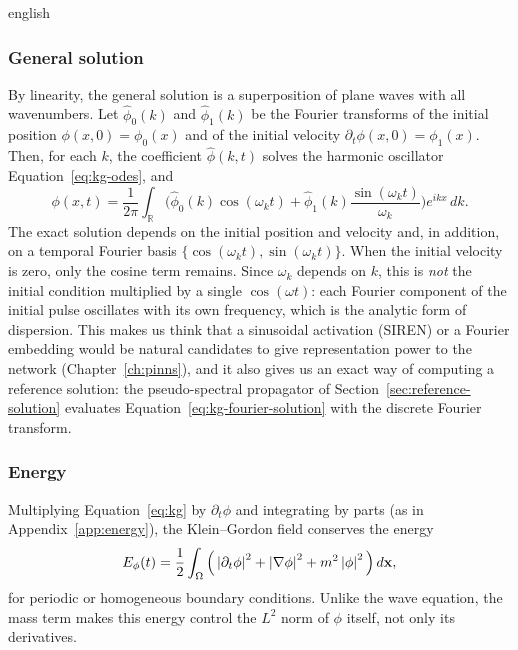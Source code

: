 \begin{hyphenrules}{english}
\subsubsection{General solution}
By linearity, the general solution is a superposition of plane waves with all wavenumbers. Let
$\hat\phi_0(k)$ and $\hat\phi_1(k)$ be the Fourier transforms of the initial position
$\phi(x,0)=\phi_0(x)$ and of the initial velocity $\partial_t\phi(x,0)=\phi_1(x)$. Then, for each $k$,
the coefficient $\hat\phi(k,t)$ solves the harmonic oscillator Equation~\eqref{eq:kg-odes}, and
\begin{equation}
  \phi(x,t)=\frac{1}{2\pi}\int_{\mathbb{R}}\Big(\hat\phi_0(k)\cos(\omega_kt)
  +\hat\phi_1(k)\frac{\sin(\omega_kt)}{\omega_k}\Big)e^{ikx}\,d k.
  \label{eq:kg-fourier-solution}
\end{equation}
The exact solution depends on the initial position and velocity and, in addition, on a temporal
Fourier basis $\{\cos(\omega_kt),\sin(\omega_kt)\}$. When the initial velocity is zero, only the cosine
term remains. Since $\omega_k$ depends on $k$, this is \emph{not} the initial condition multiplied by a
single $\cos(\omega t)$: each Fourier component of the initial pulse oscillates with its own frequency,
which is the analytic form of dispersion. This makes us think that a sinusoidal activation (SIREN) or a
Fourier embedding would be natural candidates to give representation power to the network
(Chapter~\ref{ch:pinns}), and it also gives us an exact way of computing a reference solution: the
pseudo-spectral propagator of Section~\ref{sec:reference-solution} evaluates
Equation~\eqref{eq:kg-fourier-solution} with the discrete Fourier transform.

\subsubsection{Energy}
Multiplying Equation~\eqref{eq:kg} by $\partial_t\phi$ and integrating by parts (as in Appendix~\ref{app:energy}), the
Klein--Gordon field conserves the energy
\begin{equation}
  E_\phi(t)=\frac12\int_\Omega\Big(\left\lvert \partial_t\phi \right\rvert^2+\left\lvert \nabla\phi \right\rvert^2+m^2\left\lvert \phi \right\rvert^2\Big)\,d\mathbf{x},
  \label{eq:kg-energy}
\end{equation}
for periodic or homogeneous boundary conditions. Unlike the wave equation, the mass term makes this
energy control the $L^2$ norm of $\phi$ itself, not only its derivatives.


\end{hyphenrules}
